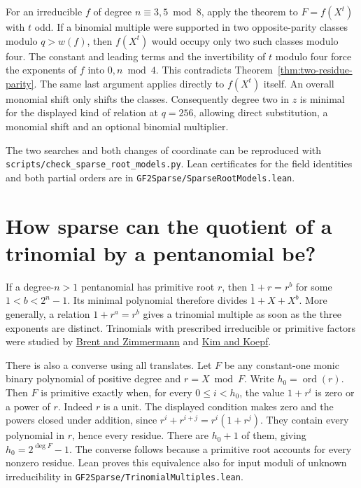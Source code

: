 \documentclass[11pt]{article}
\newcommand{\ord}{\operatorname{ord}}
\begin{document}
For an irreducible \(f\) of degree \(n\equiv3,5\bmod 8\), apply
the theorem to \(F=f(X^t)\) with \(t\) odd. If a binomial multiple
were supported in two opposite-parity classes modulo \(q>w(f)\),
then \(f(X^t)\) would occupy only two such classes modulo four.
The constant and leading terms and the invertibility of \(t\) modulo
four force the exponents of \(f\) into \(0,n\bmod4\). This contradicts
Theorem~\ref{thm:two-residue-parity}. The same last argument applies
directly to \(f(X^t)\) itself. An overall monomial shift only shifts
the classes. Consequently degree two in \(z\) is minimal for the
displayed kind of relation at \(q=256\), allowing direct substitution,
a monomial shift and an optional binomial multiplier.

The two searches and both changes of coordinate can be reproduced with
\nolinkurl{scripts/check_sparse_root_models.py}. Lean certificates
for the field identities and both partial orders are in
\nolinkurl{GF2Sparse/SparseRootModels.lean}.

\section{How sparse can the quotient of a trinomial by a pentanomial be?}
\label{sec:trinomial-multiplier}
If a degree-\(n>1\) pentanomial has primitive root \(r\), then
\(1+r=r^b\) for some \(1<b<2^n-1\). Its minimal polynomial therefore
divides \(1+X+X^b\). More generally, a relation \(1+r^a=r^b\)
gives a trinomial multiple as soon as the three exponents are distinct.
Trinomials with prescribed irreducible or primitive factors were studied
by \href{https://maths-people.anu.edu.au/~brent/pub/pub212.html}{Brent and
Zimmermann} and \href{https://arxiv.org/abs/1311.1366}{Kim and Koepf}.

There is also a converse using all translates. Let \(F\) be any
constant-one monic binary polynomial of positive degree and \(r=X\bmod F\).
Write \(h_0=\ord(r)\). Then \(F\) is primitive exactly when, for
every \(0\le i<h_0\), the value \(1+r^i\) is zero or a power of \(r\).
Indeed \(r\) is a unit. The displayed condition makes zero and the
powers closed under addition, since \(r^i+r^{i+j}=r^i(1+r^j)\).
They contain every polynomial in \(r\), hence every residue. There
are \(h_0+1\) of them, giving \(h_0=2^{\deg F}-1\). The converse
follows because a primitive root accounts for every nonzero residue.
Lean proves this equivalence also for input moduli of unknown
irreducibility in \nolinkurl{GF2Sparse/TrinomialMultiples.lean}.
\end{document}
